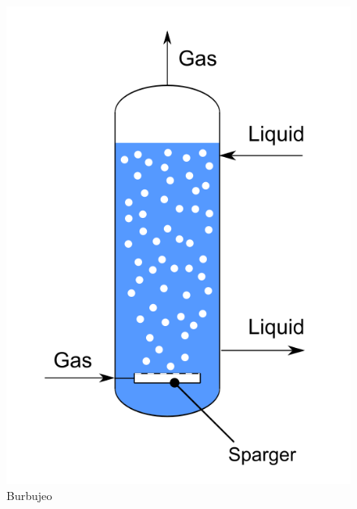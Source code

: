 \begin{multicols}{3}
    \begin{figure}
        \centering
        \includegraphics[width=\textwidth]{img/esquemas/reactor_burbujeo.png}
        \caption{Burbujeo}
        \label{fig:reactor_burbujeo}
    \end{figure}
    

\end{multicols}

